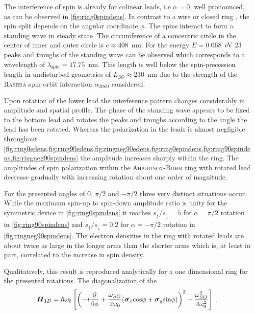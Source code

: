 The interference of spin is already for colinear leads, i.e $\alpha=0$, well pronounced, as can be observed in \cref{fig:ring0spindens}. In contrast to a wire or closed ring \cite{PhysRevB.82.165322}, the spin split depends on the angular coordinate $\phi$.
The spins interact to form a standing wave in steady state. The circumference of a concentric circle in the center of inner and outer circle is $c\approx 408$~nm. For the energy $E=0.068$~eV 23 peaks and troughs of the standing wave can be observed which corresponds to a wavelength of $\lambda_{\text{spin}}=17.75$~nm. This length is well below the spin-precession length in undisturbed geometries of $L_{SO}\approx230$~nm due to the strength of the \textsc{Rashba} spin-orbit interaction $\alpha_{RSO}$ considered.\par
Upon rotation of the lower lead the interference pattern changes considerably in amplitude and spatial profile. The phase of the standing wave appears to be fixed to the bottom lead and rotates the peaks and troughs according to the angle the lead has been rotated. Whereas the polarization in the leads is almost negligible throughout \cref{fig:ring0edens,fig:ring90edens,fig:ringneg90edens,fig:ring0spindens,fig:ring90spindens,fig:ringneg90spindens} the amplitude increases sharply within the ring. The amplitudes of spin polarization within the \textsc{Aharonov-Bohm} ring with rotated lead decrease gradually with increasing rotation about one order of magnitude.\par
For the presented angles of 0, $\pi/2$ and $-\pi/2$ three very distinct situations occur. While the maximum spin-up to spin-down amplitude ratio is unity for the symmetric device in \cref{fig:ring0spindens} it reaches $s_{\uparrow}/s_{\downarrow}=5$ for $\alpha=\pi/2$ rotation in \cref{fig:ring90spindens} and $s_{\uparrow}/s_{\downarrow}=0.2$ for $\alpha=-\pi/2$ rotation in \cref{fig:ringneg90spindens}. The electron densities in the ring with rotated leads are about twice as large in the longer arms than the shorter arms which is, at least in part, correlated to the increase in spin density.\par
Qualitatively, this result is reproduced analytically for a one dimensional ring for the presented rotations. The diagonalization of the \hamil{} \begin{align}
\mat{H}_{1D}=\hbar\omega_0 \left[\left(-i\pd{}{\phi}+\frac{\omega_{SO}}{2\omega_{0}} (\mat{\sigma}_x\text{cos}\phi+\mat{\sigma}_y\text{sin}\phi)\right)^2-\frac{\omega_{SO}^2}{4\omega_0^2}\right]\ ,
\end{align}
